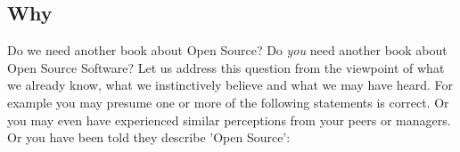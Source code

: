 %
%
%
%
%



\subsection{Why}

Do we need another book about Open Source? Do \emph{you} need another book about
Open Source Software? Let us address this question from the viewpoint of what we
already know, what we instinctively believe and what we may have heard. For
example you may presume one or more of the following statements is correct. Or
you may even have experienced similar perceptions from your peers or managers.
Or you have been told they describe 'Open Source':

